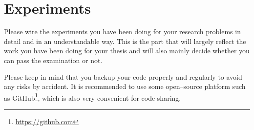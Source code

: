 \chapter{Experiments}
\label{cp:experiment}

Please wire the experiments you have been doing for your research problems in detail and in an understandable way. This is the part that will largely reflect the work you have been doing for your thesis and will also mainly decide whether you can pass the examination or not.

Please keep in mind that you backup your code properly and regularly to avoid any risks by accident. It is recommended to use some open--source platform such as GitHub\footnote{\url{https://github.com}}, which is also very convenient for code sharing.